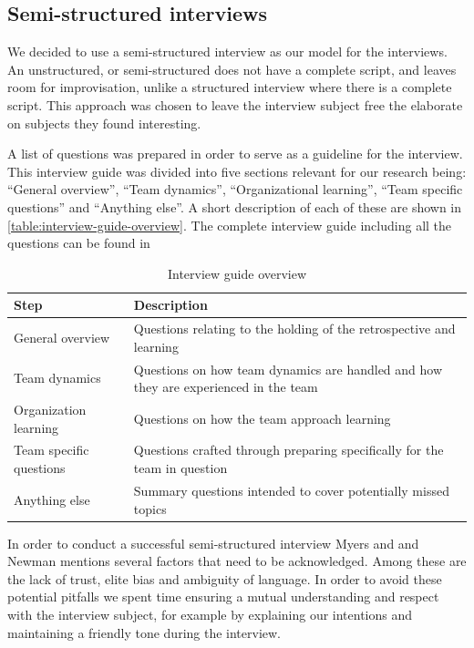 \subsection{Semi-structured interviews}
We decided to use a semi-structured interview as our model for the interviews. An unstructured, or semi-structured does not have a complete script, and leaves room for improvisation, unlike a structured interview where there is a complete script. \cite{Myers2007} This approach was chosen to leave the interview subject free the elaborate on subjects they found interesting. 

A list of questions was prepared in order to serve as a guideline for the interview. This interview guide was divided into five sections relevant for our research being: ``General overview'', ``Team dynamics'', ``Organizational learning'', ``Team specific questions'' and ``Anything else''. A short description of each of these are shown in \autoref{table:interview-guide-overview}. The complete interview guide including all the questions can be found in 

\begin{table}
	\begin{centering}
	\caption{Interview guide overview}
	\label{table:interview-guide-overview}
	\begin{tabular}{l p{}}
	 	Step & Description \\ 
		\hline
		General overview & Questions relating to the holding of the retrospective and learning\\
		Team dynamics & Questions on how team dynamics are handled and how they are experienced in the team \\
		Organization learning & Questions on how the team approach learning \\
		Team specific questions & Questions crafted through preparing specifically for the team in question \\
		Anything else & Summary questions intended to cover potentially missed topics \\
	\end{tabular}
	\end{centering}
\end{table}

In order to conduct a successful semi-structured interview Myers and and Newman mentions several factors that need to be acknowledged. \cite{Myers2007} Among these are the lack of trust, elite bias and ambiguity of language. In order to avoid these potential pitfalls we spent time ensuring a mutual understanding and respect with the interview subject, for example by explaining our intentions and maintaining a friendly tone during the interview. 

